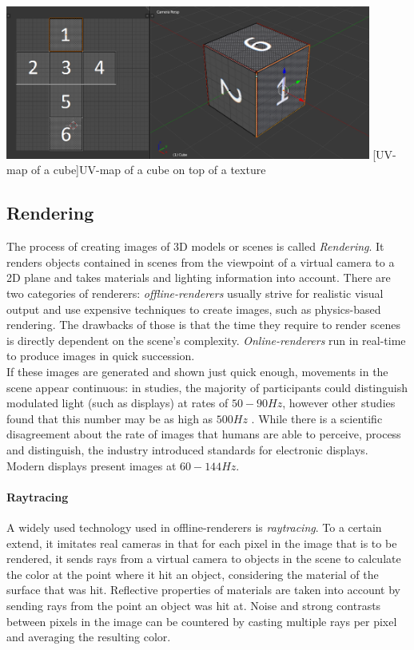 \begin{center}
\noindent\includegraphics[width=12cm]{tex/img/ch03/CubeUVMapping.png}
[UV-map of a cube]{UV-map of a cube on top of a texture}
\label{fig:3d-cube-uv-mapping}
\end{center}

\subsection{Rendering}
The process of creating images of 3D models or scenes is called \emph{Rendering}. It renders objects contained in scenes from the viewpoint of a virtual camera to a 2D plane and takes materials and lighting information into account. There are two categories of renderers: \emph{offline-renderers} usually strive for realistic visual output and use expensive techniques to create images, such as physics-based rendering. The drawbacks of those is that the time they require to render scenes is directly dependent on the scene's complexity. \emph{Online-renderers} run in real-time to produce images in quick succession.\\
If these images are generated and shown just quick enough, movements in the scene appear continuous: in studies, the majority of participants could distinguish modulated light (such as displays) at rates of $50-90 Hz$, however other studies found that this number may be as high as $500 Hz$ \cite{Davis2015}. While there is a scientific disagreement about the rate of images that humans are able to perceive, process and distinguish, the industry introduced standards for electronic displays. Modern displays present images at $60-144 Hz$.

\paragraph{Raytracing} A widely used technology used in offline-renderers is \emph{raytracing}. To a certain extend, it imitates real cameras in that for each pixel in the image that is to be rendered, it sends rays from a virtual camera to objects in the scene to calculate the color at the point where it hit an object, considering the material of the surface that was hit. Reflective properties of materials are taken into account by sending rays from the point an object was hit at. Noise and strong contrasts between pixels in the image can be countered by casting multiple rays per pixel and averaging the resulting color.

